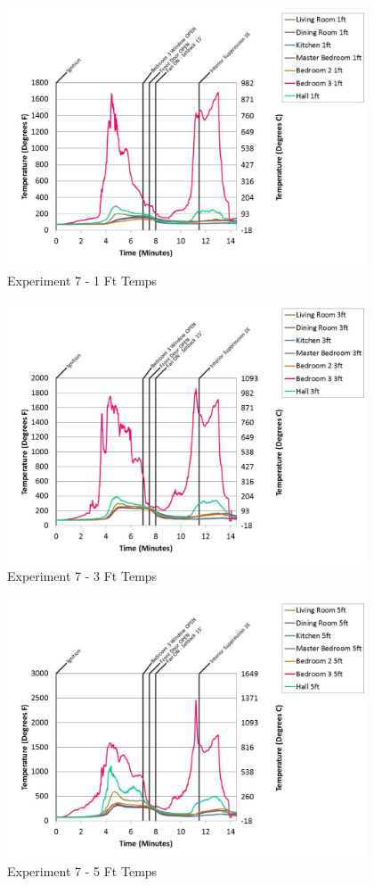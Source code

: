 \documentclass{article}
\begin{document}
\begin{appendices}
	\begin{figure}[h!]
		\centering
		\includegraphics[height=3.05in]{0_Images/Results_Charts/Exp_7_Charts/1FtTemps.pdf}
		\caption{Experiment 7 - 1 Ft Temps}
	\end{figure}
 

	\begin{figure}[h!]
		\centering
		\includegraphics[height=3.05in]{0_Images/Results_Charts/Exp_7_Charts/3FtTemps.pdf}
		\caption{Experiment 7 - 3 Ft Temps}
	\end{figure}
 
	\clearpage

	\begin{figure}[h!]
		\centering
		\includegraphics[height=3.05in]{0_Images/Results_Charts/Exp_7_Charts/5FtTemps.pdf}
		\caption{Experiment 7 - 5 Ft Temps}
	\end{figure}
 


\end{appendices}
\end{document}
